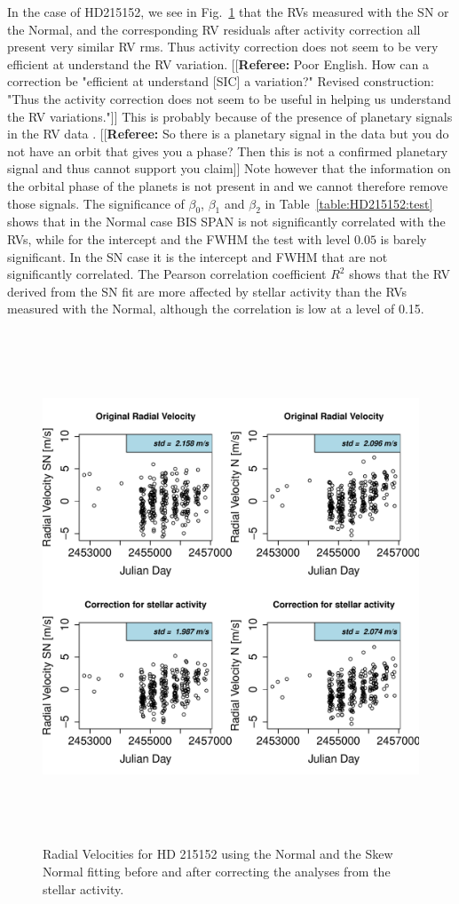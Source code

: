 \documentclass[11pt, oneside]{article}
\newcommand{\comment}[1]{{\color{red}[[\textbf{Referee: }#1]]}}
\begin{document}
In the case of HD215152, we see in Fig.~\ref{fig:HD215152:correctionRV} that the RVs measured with the SN or the Normal, and the corresponding RV residuals after activity correction all present very similar RV rms. Thus activity correction does not seem to be very efficient at understand the RV variation. 
\comment{Poor English. How can a correction be "efficient at understand [SIC] a variation?"
Revised construction: "Thus the activity correction does not seem to be useful in helping us understand the RV variations."}
This is probably because of the presence of planetary signals in the RV data \citep[][]{Mayor-2011}. 
\comment{So there is a planetary signal in the data but you do not have an orbit that gives you a phase? Then this is not a confirmed planetary signal and thus cannot support you claim}
Note however that the information on the orbital phase of the planets is not present in \citet{Mayor-2011} and we cannot therefore remove those signals. The significance of $\beta_{0}$, $\beta_{1}$ and $\beta_{2}$ in Table~\ref{table:HD215152:test} shows that in the Normal case BIS SPAN is not significantly correlated with the RVs, while for the intercept and the FWHM the test with level $0.05$ is barely significant. In the SN case it is the intercept and FWHM that are not significantly correlated. The Pearson correlation coefficient $R^2$ shows that the RV derived from the SN fit are more affected by stellar activity than the RVs measured with the Normal, although the correlation is low at a level of 0.15.
%
\begin{figure}[htbp]
   \centering
\includegraphics[height = 6in]{HD21515_[3]CorrectionActivity_RadialVelocity_vs_time.pdf} 
   \caption{Radial Velocities for HD 215152 using the Normal and the Skew Normal fitting before and after correcting the analyses from the stellar activity.}
   \label{fig:HD215152:correctionRV}
\end{figure}
\end{document}
